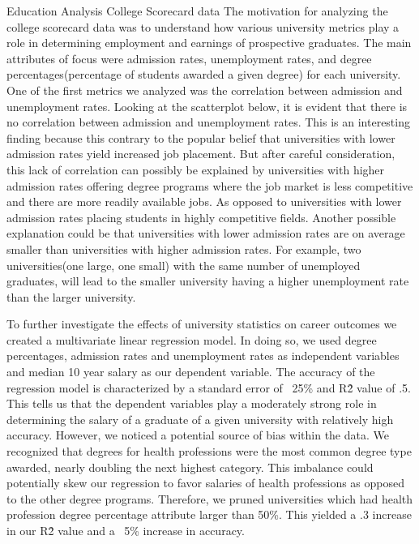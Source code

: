 Education Analysis
College Scorecard data
The motivation for analyzing the college scorecard data \cite{collegeScorecard} was to understand how various university metrics play a role in determining employment and earnings of prospective graduates. The main attributes of focus were admission rates, unemployment rates, and degree percentages(percentage of students awarded a given degree) for each university. One of the first metrics we analyzed was the correlation between admission and unemployment rates. Looking at the scatterplot below, it is evident that there is no correlation between admission and unemployment rates. This is an interesting finding because this contrary to the popular belief that universities with lower admission rates yield increased job placement. But after careful consideration, this lack of correlation can possibly be explained by universities with higher admission rates offering degree programs where the job market is less competitive and there are more readily available jobs. As opposed to universities with lower admission rates placing students in highly competitive fields. Another possible explanation could be that universities with lower admission rates are on average smaller than universities with higher admission rates. For example, two universities(one large, one small) with the same number of unemployed graduates, will lead to the smaller university having a higher unemployment rate than the larger university.

To further investigate the effects of university statistics on career outcomes we created a multivariate linear regression model.
In doing so, we used degree percentages, admission rates and unemployment rates as independent variables and median 10 year salary as our dependent variable.
The accuracy of the regression model is characterized by a standard error of ~25\% and R\^2 value of .5. This tells us that the dependent variables play a moderately strong role in determining the salary of a graduate of a given university with relatively high accuracy. However, we noticed a potential source of bias within the data. We recognized that degrees for health professions were the most common degree type awarded, nearly doubling the next highest category. This imbalance could potentially skew our regression to favor salaries of health professions as opposed to the other degree programs. Therefore, we pruned universities which had health profession degree percentage attribute larger than 50\%. This yielded a .3 increase in our R\^2 value and a ~5\% increase in accuracy.


